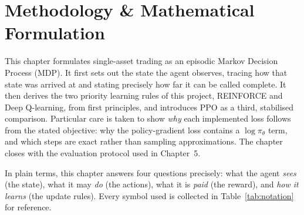 \chapter{Methodology \& Mathematical Formulation}
\label{ch:methodology}

This chapter formulates single-asset trading as an episodic Markov Decision
Process (MDP). It first sets out the state the agent observes, tracing how
that state was arrived at and stating precisely how far it can be called
complete. It then derives the two priority learning rules of this project,
REINFORCE and Deep Q-learning, from first principles, and introduces PPO
as a third, stabilised comparison. Particular care is taken to show
\emph{why} each implemented loss follows from the stated objective: why
the policy-gradient loss contains a $\log\pi_\theta$ term, and which steps
are exact rather than sampling approximations. The chapter closes with the
evaluation protocol used in Chapter~5.

In plain terms, this chapter answers four questions precisely: what the
agent \emph{sees} (the state), what it may \emph{do} (the actions), what
it is \emph{paid} (the reward), and \emph{how it learns} (the update
rules). Every symbol used is collected in Table~\ref{tab:notation} for
reference.

